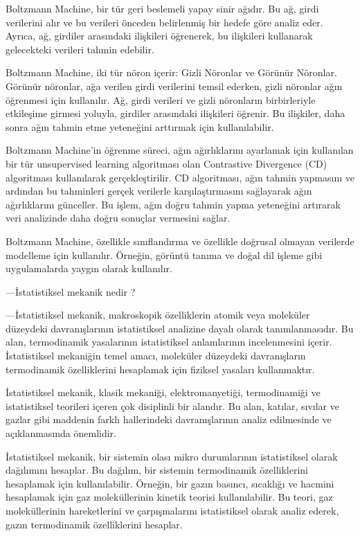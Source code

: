 \documentclass[11pt]{article}
\begin{document}
Boltzmann Machine, bir tür geri beslemeli yapay sinir ağıdır. Bu ağ, girdi verilerini alır ve bu verileri önceden belirlenmiş bir hedefe göre analiz eder. Ayrıca, ağ, girdiler arasındaki ilişkileri öğrenerek, bu ilişkileri kullanarak gelecekteki verileri tahmin edebilir.

Boltzmann Machine, iki tür nöron içerir: Gizli Nöronlar ve Görünür Nöronlar. Görünür nöronlar, ağa verilen girdi verilerini temsil ederken, gizli nöronlar ağın öğrenmesi için kullanılır. Ağ, girdi verileri ve gizli nöronların birbirleriyle etkileşime girmesi yoluyla, girdiler arasındaki ilişkileri öğrenir. Bu ilişkiler, daha sonra ağın tahmin etme yeteneğini arttırmak için kullanılabilir.

Boltzmann Machine'in öğrenme süreci, ağın ağırlıklarını ayarlamak için kullanılan bir tür unsupervised learning algoritması olan Contrastive Divergence (CD) algoritması kullanılarak gerçekleştirilir. CD algoritması, ağın tahmin yapmasını ve ardından bu tahminleri gerçek verilerle karşılaştırmasını sağlayarak ağın ağırlıklarını günceller. Bu işlem, ağın doğru tahmin yapma yeteneğini artırarak veri analizinde daha doğru sonuçlar vermesini sağlar.

Boltzmann Machine, özellikle sınıflandırma ve özellikle doğrusal olmayan verilerde modelleme için kullanılır. Örneğin, görüntü tanıma ve doğal dil işleme gibi uygulamalarda yaygın olarak kullanılır.


---İstatistiksel mekanik nedir ?

---İstatistiksel mekanik, makroskopik özelliklerin atomik veya moleküler düzeydeki davranışlarının istatistiksel analizine dayalı olarak tanımlanmasıdır. Bu alan, termodinamik yasalarının istatistiksel anlamlarının incelenmesini içerir. İstatistiksel mekaniğin temel amacı, moleküler düzeydeki davranışların termodinamik özelliklerini hesaplamak için fiziksel yasaları kullanmaktır.

İstatistiksel mekanik, klasik mekaniği, elektromanyetiği, termodinamiği ve istatistiksel teorileri içeren çok disiplinli bir alandır. Bu alan, katılar, sıvılar ve gazlar gibi maddenin farklı hallerindeki davranışlarının analiz edilmesinde ve açıklanmasında önemlidir.

İstatistiksel mekanik, bir sistemin olası mikro durumlarının istatistiksel olarak dağılımını hesaplar. Bu dağılım, bir sistemin termodinamik özelliklerini hesaplamak için kullanılabilir. Örneğin, bir gazın basıncı, sıcaklığı ve hacmini hesaplamak için gaz moleküllerinin kinetik teorisi kullanılabilir. Bu teori, gaz moleküllerinin hareketlerini ve çarpışmalarını istatistiksel olarak analiz ederek, gazın termodinamik özelliklerini hesaplar.
\end{document}
